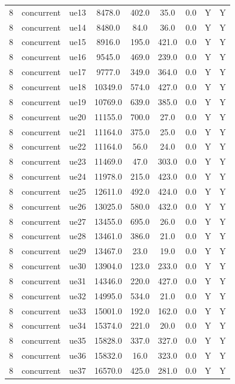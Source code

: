 \begin{table}[ht]
\begin{tabular}{|c|c|c|c|c|c|c|c|c|}
8 & concurrent & ue13 & 8478.0 & 402.0 & 35.0 & 0.0 & Y & Y \\
8 & concurrent & ue14 & 8480.0 & 84.0 & 36.0 & 0.0 & Y & Y \\
8 & concurrent & ue15 & 8916.0 & 195.0 & 421.0 & 0.0 & Y & Y \\
8 & concurrent & ue16 & 9545.0 & 469.0 & 239.0 & 0.0 & Y & Y \\
8 & concurrent & ue17 & 9777.0 & 349.0 & 364.0 & 0.0 & Y & Y \\
8 & concurrent & ue18 & 10349.0 & 574.0 & 427.0 & 0.0 & Y & Y \\
8 & concurrent & ue19 & 10769.0 & 639.0 & 385.0 & 0.0 & Y & Y \\
8 & concurrent & ue20 & 11155.0 & 700.0 & 27.0 & 0.0 & Y & Y \\
8 & concurrent & ue21 & 11164.0 & 375.0 & 25.0 & 0.0 & Y & Y \\
8 & concurrent & ue22 & 11164.0 & 56.0 & 24.0 & 0.0 & Y & Y \\
8 & concurrent & ue23 & 11469.0 & 47.0 & 303.0 & 0.0 & Y & Y \\
8 & concurrent & ue24 & 11978.0 & 215.0 & 423.0 & 0.0 & Y & Y \\
8 & concurrent & ue25 & 12611.0 & 492.0 & 424.0 & 0.0 & Y & Y \\
8 & concurrent & ue26 & 13025.0 & 580.0 & 432.0 & 0.0 & Y & Y \\
8 & concurrent & ue27 & 13455.0 & 695.0 & 26.0 & 0.0 & Y & Y \\
8 & concurrent & ue28 & 13461.0 & 386.0 & 21.0 & 0.0 & Y & Y \\
8 & concurrent & ue29 & 13467.0 & 23.0 & 19.0 & 0.0 & Y & Y \\
8 & concurrent & ue30 & 13904.0 & 123.0 & 233.0 & 0.0 & Y & Y \\
8 & concurrent & ue31 & 14346.0 & 220.0 & 427.0 & 0.0 & Y & Y \\
8 & concurrent & ue32 & 14995.0 & 534.0 & 21.0 & 0.0 & Y & Y \\
8 & concurrent & ue33 & 15001.0 & 192.0 & 162.0 & 0.0 & Y & Y \\
8 & concurrent & ue34 & 15374.0 & 221.0 & 20.0 & 0.0 & Y & Y \\
8 & concurrent & ue35 & 15828.0 & 337.0 & 327.0 & 0.0 & Y & Y \\
8 & concurrent & ue36 & 15832.0 & 16.0 & 323.0 & 0.0 & Y & Y \\
8 & concurrent & ue37 & 16570.0 & 425.0 & 281.0 & 0.0 & Y & Y \\

\end{tabular}
\end{table}
